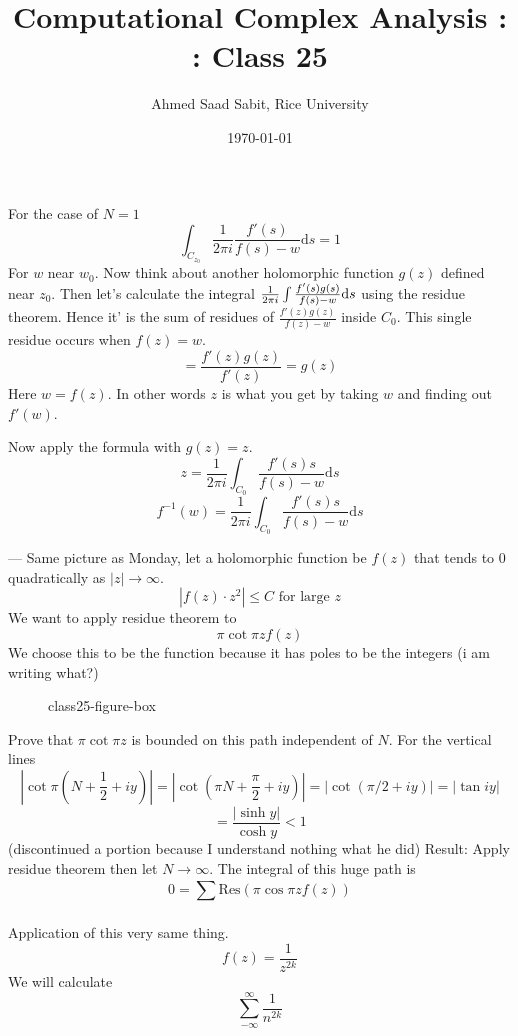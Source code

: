 \documentclass[letter]{article}
\title{Computational Complex Analysis : : Class 25}
\author{Ahmed Saad Sabit, Rice University}
\date{\today}
\begin{document}
\maketitle
For the case of $N= 1$ 
\[
	\int_{C_{z_0}} \frac{1}{2\pi i }\frac{f'(s)}{f(s) - w } \mathrm{d} s = 1
\]
For $w$ near $w_0$. Now think about another holomorphic function $g(z)$ defined near $z_0$. Then let's calculate the integral $\frac{1}{2\pi i }\int {f'(s) g(s) \over f(s) - w } \mathrm{d} s$ using the residue theorem. 
Hence it' is the sum of residues of $\frac{f'(z) g(z)}{f(z) - w}$ inside $C_0$. This single residue occurs when $f(z) = w$. 
\[
= \frac{f'(z) g(z) }{f'(z)} = g(z)
\] 
Here $ w = f(z)$. In other words $z$ is what you get by taking $w$ and finding out $f'(w)$. 

Now apply the formula with $g(z) = z$. 
\[
	z = \frac{1}{2 \pi i }\int_{C_0} \frac{f'(s) s}{f(s) - w} \mathrm{d}  s
\] 
\[
	f^{-1}(w) = \frac{1}{2 \pi i} \int_{C_0} \frac{f'(s) s}{f(s) - w} \mathrm{d} s
\] 

---
Same picture as Monday, let a holomorphic function be $f(z)$ that tends to 0 quadratically as $|z| \to \infty$. 
\[
	\left|
{f(z) \cdot  z^2} \right| \le C \text{ for large } z
\]
We want to apply residue theorem to 
\[
\pi \cot \pi z f(z)
\] We choose this to be the function because it has poles to be the integers (i am writing what?) 
\begin{figure}[ht]
    \centering
    \caption{class25-figure-box}
    \label{fig:class25-figure-box}
\end{figure}

Prove that $\pi \cot \pi z $ is bounded on this path independent of $N$. For the vertical lines 
\[
|\cot \pi (N  + \frac{1}{2} + i y) |= |\cot ( \pi N  + \frac{\pi}{2} + iy)| = 
| \cot (\pi /2 + i y) | = |\tan iy| 
\]
\[
= \frac{| \sinh y| }{\cosh y } < 1
\]
(discontinued a portion because I understand nothing what he did)
Result: Apply residue theorem then let $N\to \infty$. The integral of this huge path is 
\[
0 = \sum_{}^{} \text{Res} \left(\pi \cos \pi z f(z)\right)
\]

Application of this very same thing. 
\[
f(z) = \frac{1}{z^{2k}}
\] We will calculate 
\[
\sum_{-\infty}^{\infty} \frac{1}{n^{2k}}
\] 
\end{document}
